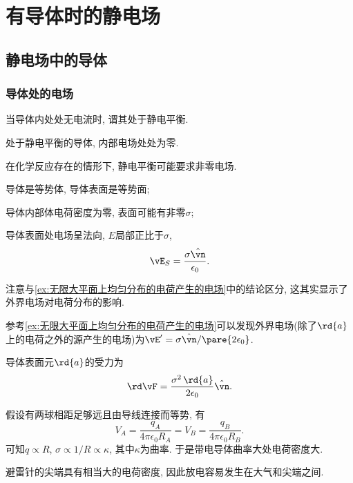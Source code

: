 \documentclass[../Electromagnetism.tex]{subfiles}
\begin{document}
\section{有导体时的静电场} %
\label{sec:有导体时的静电场}

\subsection{静电场中的导体} %
\label{sub:静电场中的导体}

\subsubsection{导体处的电场} %
\label{ssub:导体处的电场}

\begin{definition}[导体中的静电平衡]
	当导体内处处无电流时, 谓其处于静电平衡.
\end{definition}
\begin{corollary}[静电平衡条件]
	处于静电平衡的导体, 内部电场处处为零.
\end{corollary}
\begin{remark}
	\label{rm:静电平衡可能要求非零电场}
	在化学反应存在的情形下, 静电平衡可能要求非零电场.
\end{remark}
\begin{corollary}[导体附近电场的性质]\quad
	\begin{cenum}
		\item 导体是等势体, 导体表面是等势面;
		\item 导体内部体电荷密度为零, 表面可能有非零$\sigma$;
		\item 导体表面处电场呈法向, $E$局部正比于$\sigma$,
		\[ \vE_S = \frac{\sigma \hat{\vn}}{\epsilon_0}. \]
	\end{cenum}
\end{corollary}
\begin{remark}
	注意与\cref{ex:无限大平面上均匀分布的电荷产生的电场}中的结论区分, 这其实显示了外界电场对电荷分布的影响.
\end{remark}
参考\cref{ex:无限大平面上均匀分布的电荷产生的电场}可以发现外界电场(除了$\rd{a}$上的电荷之外的源产生的电场)为$\vE' = \sigma\hat{\vn}/\pare{2\epsilon_0}$.
\begin{finale}
	\begin{corollary}[导体表面受力]
		导体表面元$\rd{a}$的受力为
		\begin{equation}
			\label{eq:导体表面元受力}
			\rd\vF = \frac{\sigma^2\,\rd{a}}{2\epsilon_0}\hat{\vn}.
		\end{equation}
	\end{corollary}
\end{finale}
假设有两球相距足够远且由导线连接而等势, 有
\[ V_A = \frac{q_A}{4\pi\epsilon_0 R_A} = V_B = \frac{q_B}{4\pi\epsilon_0 R_B}. \]
可知$q\propto R$, $\sigma \propto 1/R \propto \kappa$, 其中$\kappa$为曲率. 于是带电导体曲率大处电荷密度大.
\begin{ex}
	避雷针的尖端具有相当大的电荷密度, 因此放电容易发生在大气和尖端之间.
\end{ex}
\end{document}
